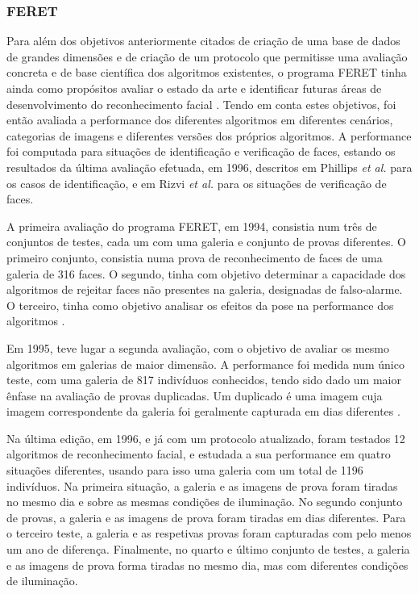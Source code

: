 \subsubsection{FERET}
Para além dos objetivos anteriormente citados de criação de uma base de dados de grandes dimensões e de criação de um protocolo que permitisse uma avaliação concreta e de base científica dos algoritmos existentes, o programa FERET tinha ainda como propósitos avaliar o estado da arte e identificar futuras áreas de desenvolvimento do reconhecimento facial \cite{Phillips2000}. Tendo em conta estes objetivos, foi então avaliada a performance dos diferentes algoritmos em diferentes cenários, categorias de imagens e diferentes versões dos próprios algoritmos. A performance foi computada para situações de identificação e verificação de faces, estando os resultados da última avaliação efetuada, em 1996, descritos em Phillips \textit{et al.} \cite{Phillips2000} para os casos de identificação, e em Rizvi \textit{et al.} \cite{Rizvi2000} para os situações de verificação de faces.

A primeira avaliação do programa FERET, em 1994, consistia num três de conjuntos de testes, cada um com uma galeria e conjunto de provas diferentes. O primeiro conjunto, consistia numa prova de reconhecimento de faces de uma galeria de 316 faces. O segundo, tinha com objetivo determinar a capacidade dos algoritmos de rejeitar faces não presentes na galeria, designadas de falso-alarme. O terceiro, tinha como objetivo analisar os efeitos da pose na performance dos algoritmos \citep{Phillips2000}.

Em 1995, teve lugar a segunda avaliação, com o objetivo de  avaliar os mesmo algoritmos em galerias de maior dimensão. A performance foi medida num único teste, com uma galeria de 817 indivíduos conhecidos, tendo sido dado um maior ênfase na avaliação de provas duplicadas. Um duplicado é uma imagem cuja imagem correspondente da galeria foi geralmente capturada em dias diferentes  \citep{Phillips2000}.

Na última edição, em 1996, e já com um protocolo atualizado, foram testados 12 algoritmos de reconhecimento facial, e estudada a sua performance em quatro situações diferentes, usando para isso uma galeria com um total de 1196 indivíduos. Na primeira situação, a galeria e as imagens de prova foram tiradas no mesmo dia e sobre as mesmas condições de iluminação. No segundo conjunto de provas, a galeria e as imagens de prova foram tiradas em dias diferentes. Para o terceiro teste, a galeria e as respetivas provas foram capturadas com pelo menos um ano de diferença. Finalmente, no quarto e último conjunto de testes, a galeria e as imagens de prova forma tiradas no mesmo dia, mas com diferentes condições de iluminação.

